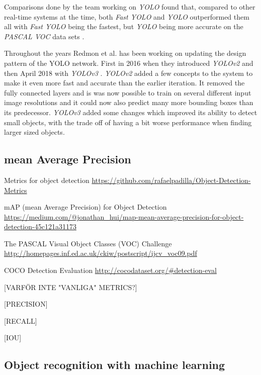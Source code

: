 Comparisons done by the team working on \textit{YOLO} found that, compared to other real-time systems at the time, both \textit{Fast YOLO} and \textit{YOLO} outperformed them all with \textit{Fast YOLO} being the fastest, but \textit{YOLO} being more accurate on the \textit{PASCAL VOC} data sets \cite{PASCAL}.

Throughout the years Redmon et al. has been working on updating the design pattern of the 
YOLO network. First in 2016 when they introduced \textit{YOLOv2} and then April 2018 with \textit{YOLOv3} \cite{YOLO2}\cite{YOLO3}. \textit{YOLOv2} added a few concepts to the system to make it even more fast and accurate than the earlier iteration. It removed the fully connected layers and is was now possible to train on several different input image resolutions and it could now also predict many more bounding boxes than its predecessor. \textit{YOLOv3} added some changes which improved its ability to detect small objects, with the trade off of having a bit worse performance when finding larger sized objects.  

\subsection{mean Average Precision}
Metrics for object detection
\url{https://github.com/rafaelpadilla/Object-Detection-Metrics}

mAP (mean Average Precision) for Object Detection
\url{https://medium.com/@jonathan_hui/map-mean-average-precision-for-object-detection-45c121a31173}

The PASCAL Visual Object Classes (VOC) Challenge
\url{http://homepages.inf.ed.ac.uk/ckiw/postscript/ijcv_voc09.pdf}

COCO Detection Evaluation
\url{http://cocodataset.org/#detection-eval}

[VARFÖR INTE "VANLIGA" METRICS?]

[PRECISION]

[RECALL]

[IOU]


\subsection{Object recognition with machine learning}


\newpage
